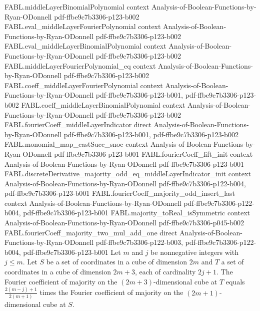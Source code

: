 \begin{theorem}
\proofstep
  {FABL.middleLayerBinomialPolynomial}
  {context}
  {Analysis-of-Boolean-Functions-by-Ryan-ODonnell}
  {pdf-ffbe9c7b3306-p123-b002}
\proofstep
  {FABL.eval_middleLayerFourierPolynomial}
  {context}
  {Analysis-of-Boolean-Functions-by-Ryan-ODonnell}
  {pdf-ffbe9c7b3306-p123-b002}
\proofstep
  {FABL.eval_middleLayerBinomialPolynomial}
  {context}
  {Analysis-of-Boolean-Functions-by-Ryan-ODonnell}
  {pdf-ffbe9c7b3306-p123-b002}
\proofstep
  {FABL.middleLayerFourierPolynomial_eq}
  {context}
  {Analysis-of-Boolean-Functions-by-Ryan-ODonnell}
  {pdf-ffbe9c7b3306-p123-b002}
\proofstep
  {FABL.coeff_middleLayerFourierPolynomial}
  {context}
  {Analysis-of-Boolean-Functions-by-Ryan-ODonnell}
  {pdf-ffbe9c7b3306-p123-b001,
    pdf-ffbe9c7b3306-p123-b002}
\proofstep
  {FABL.coeff_middleLayerBinomialPolynomial}
  {context}
  {Analysis-of-Boolean-Functions-by-Ryan-ODonnell}
  {pdf-ffbe9c7b3306-p123-b002}
\proofstep
  {FABL.fourierCoeff_middleLayerIndicator}
  {direct}
  {Analysis-of-Boolean-Functions-by-Ryan-ODonnell}
  {pdf-ffbe9c7b3306-p123-b001,
    pdf-ffbe9c7b3306-p123-b002}
\proofstep
  {FABL.monomial_map_castSucc_snoc}
  {context}
  {Analysis-of-Boolean-Functions-by-Ryan-ODonnell}
  {pdf-ffbe9c7b3306-p123-b001}
\proofstep
  {FABL.fourierCoeff_lift_init}
  {context}
  {Analysis-of-Boolean-Functions-by-Ryan-ODonnell}
  {pdf-ffbe9c7b3306-p123-b001}
\proofstep
  {FABL.discreteDerivative_majority_odd_eq_middleLayerIndicator_init}
  {context}
  {Analysis-of-Boolean-Functions-by-Ryan-ODonnell}
  {pdf-ffbe9c7b3306-p122-b004,
    pdf-ffbe9c7b3306-p123-b001}
\proofstep
  {FABL.fourierCoeff_majority_odd_insert_last}
  {context}
  {Analysis-of-Boolean-Functions-by-Ryan-ODonnell}
  {pdf-ffbe9c7b3306-p122-b004,
    pdf-ffbe9c7b3306-p123-b001}
\proofstep
  {FABL.majority_toReal_isSymmetric}
  {context}
  {Analysis-of-Boolean-Functions-by-Ryan-ODonnell}
  {pdf-ffbe9c7b3306-p045-b002}
\proofstep
  {FABL.fourierCoeff_majority_two_mul_add_one}
  {direct}
  {Analysis-of-Boolean-Functions-by-Ryan-ODonnell}
  {pdf-ffbe9c7b3306-p122-b003,
    pdf-ffbe9c7b3306-p122-b004,
    pdf-ffbe9c7b3306-p123-b001}
Let $m$ and $j$ be nonnegative integers with $j\le m$. Let $S$ be a set of coordinates
in a cube of dimension $2m$ and $T$ a set of coordinates in a cube of dimension $2m+3$,
each of cardinality $2j+1$. The Fourier coefficient of majority on the
$(2m+3)$-dimensional cube at $T$ equals $\frac{2(m-j)+1}{2(m+1)}$ times the Fourier
coefficient of majority on the $(2m+1)$-dimensional cube at $S$.
\end{theorem}

